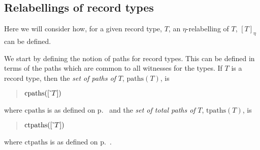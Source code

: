 




\subsection{Relabellings of record types}

Here we will consider how, for a given record
type, $T$, an $\eta$-relabelling of $T$, $[T]_\eta$ can be defined.

We start by defining the notion of paths for record types.  This can
be defined in terms of the paths which are common to all witnesses for
the types.  If $T$ is a record type, then the \textit{set of paths of}
$T$, $\mathrm{paths}(T)$, is
\begin{quote}
$\mathrm{cpaths}([\ \!\check{}\ \!T])$
\end{quote}
where $\mathrm{cpaths}$ is as defined on p.~\pageref{pg:cpaths} and the
\textit{set of total paths of} $T$, $\mathrm{tpaths}(T)$, is
\begin{quote}
$\mathrm{ctpaths}([\ \!\check{}\ \!T])$
\end{quote}
where $\mathrm{ctpaths}$ is as defined on p.~\pageref{pg:ctpaths}.

